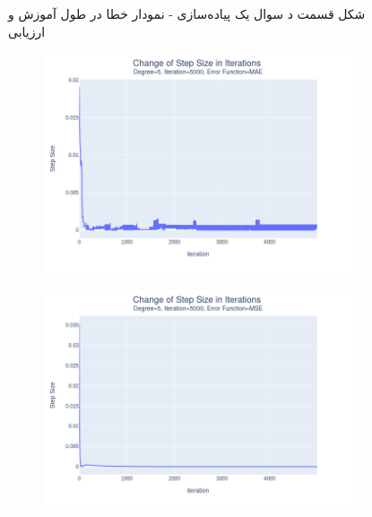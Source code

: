 \documentclass[14pt,a4]{article}
\begin{document}
\begin{figure}[h]
\begin{subfigure}{0.3\linewidth}
    \end{subfigure}
    \caption{شکل قسمت د سوال یک پیاده‌سازی - نمودار خطا در طول آموزش و ارزیابی}
    \label{implementation-q1p4-error}
\end{figure}

\begin{figure}[h]
    \centering
    \begin{subfigure}{0.3\linewidth}
        \centering
        \includegraphics[width=\textwidth]{images/implementation/q1/part_d/step_size/5_5000_MAE.png}
    \end{subfigure}
    \hfill
    \begin{subfigure}{0.3\textwidth}
        \centering
        \includegraphics[width=\textwidth]{images/implementation/q1/part_d/step_size/5_5000_MSE.png}
    \end{subfigure}

\end{figure}
\end{document}
